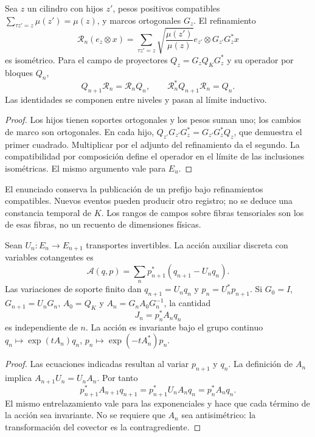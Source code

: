 \begin{proposition}
\label{x_reciprocidad:lib01:refinamiento}
Sea \(z\) un cilindro con hijos \(z'\), pesos positivos compatibles
\(\sum_{\tau z'=z}\mu(z')=\mu(z)\), y marcos ortogonales \(G_z\).
El refinamiento
\[
 \mathcal R_n(e_z\otimes x)=
 \sum_{\tau z'=z}\sqrt{\frac{\mu(z')}{\mu(z)}}
 e_{z'}\otimes G_{z'}G_z^*x
\]
es isométrico. Para el campo de proyectores
\(Q_z=G_zQ_KG_z^*\) y su operador por bloques \(Q_n\),
\[
 Q_{n+1}\mathcal R_n=\mathcal R_nQ_n,
 \qquad \mathcal R_n^*Q_{n+1}\mathcal R_n=Q_n.
\]
Las identidades se componen entre niveles y pasan al límite inductivo.
\end{proposition}
\begin{proof}
Los hijos tienen soportes ortogonales y los pesos suman uno; los cambios
de marco son ortogonales. En cada hijo,
\(Q_{z'}G_{z'}G_z^*=G_{z'}G_z^*Q_z\), que demuestra el primer
cuadrado. Multiplicar por el adjunto del refinamiento da el segundo.
La compatibilidad por composición define el operador en el límite de
las inclusiones isométricas. El mismo argumento vale para \(E_u\).
\end{proof}

El enunciado conserva la publicación de un prefijo bajo refinamientos
compatibles. Nuevos eventos pueden producir otro registro; no se deduce
una constancia temporal de \(K\). Los rangos de campos sobre fibras
tensoriales son los de esas fibras, no un recuento de dimensiones físicas.

\begin{proposition}
\label{x_reciprocidad:lib01:carga-noether}
Sean \(U_n:E_n\to E_{n+1}\) transportes invertibles. La acción
auxiliar discreta con variables cotangentes es
\[
 \mathcal A(q,p)=\sum_n p_{n+1}^*(q_{n+1}-U_nq_n).
\]
Las variaciones de soporte finito dan
\(q_{n+1}=U_nq_n\) y \(p_n=U_n^*p_{n+1}\). Si
\(G_0=I\), \(G_{n+1}=U_nG_n\), \(A_0=Q_K\) y
\(A_n=G_nA_0G_n^{-1}\), la cantidad
\[
 J_n=p_n^*A_nq_n
\]
es independiente de \(n\). La acción es invariante bajo el grupo
continuo
\(q_n\mapsto\exp(tA_n)q_n\),
\(p_n\mapsto\exp(-tA_n^*)p_n\).
\end{proposition}
\begin{proof}
Las ecuaciones indicadas resultan al variar \(p_{n+1}\) y \(q_n\).
La definición de \(A_n\) implica
\(A_{n+1}U_n=U_nA_n\). Por tanto
\[
 p_{n+1}^*A_{n+1}q_{n+1}
 =p_{n+1}^*U_nA_nq_n=p_n^*A_nq_n.
\]
El mismo entrelazamiento vale para las exponenciales y hace que cada
término de la acción sea invariante. No se requiere que \(A_n\)
sea antisimétrico: la transformación del covector es la contragrediente.
\end{proof}

